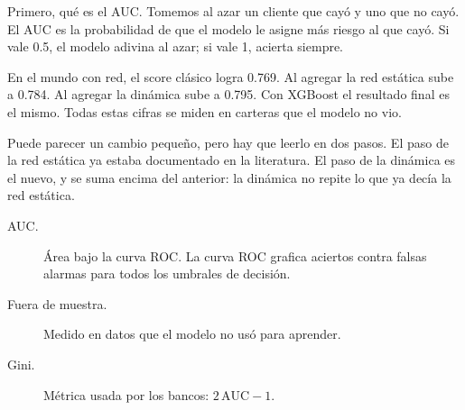 \begin{decir}
Primero, qué es el AUC. Tomemos al azar un cliente que cayó y uno que no cayó. El AUC es
la probabilidad de que el modelo le asigne más riesgo al que cayó. Si vale 0.5, el
modelo adivina al azar; si vale 1, acierta siempre.

En el mundo con red, el score clásico logra 0.769. Al agregar la red estática sube a
0.784. Al agregar la dinámica sube a 0.795. Con XGBoost el resultado final es el mismo.
Todas estas cifras se miden en carteras que el modelo no vio.

Puede parecer un cambio pequeño, pero hay que leerlo en dos pasos. El paso de la red
estática ya estaba documentado en la literatura. El paso de la dinámica es el nuevo, y se
suma encima del anterior: la dinámica no repite lo que ya decía la red estática.
\end{decir}
\begin{terminos}
\begin{description}
\item[AUC.] Área bajo la curva ROC. La curva ROC grafica aciertos contra falsas alarmas
para todos los umbrales de decisión.
\item[Fuera de muestra.] Medido en datos que el modelo no usó para aprender.
\item[Gini.] Métrica usada por los bancos: $2\,\mathrm{AUC}-1$.
\end{description}
\end{terminos}
\begin{preguntas}
\end{preguntas}

